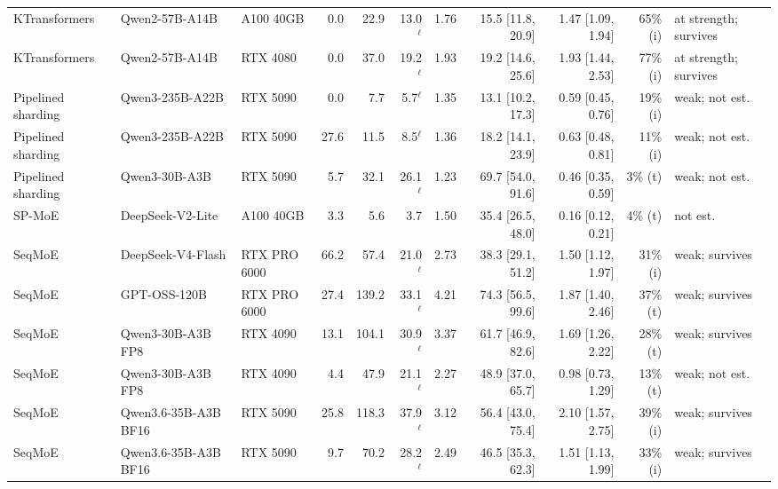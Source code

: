 \begin{table}[t]
{\begin{tabular}{lllrrrrrrrl}
KTransformers & Qwen2-57B-A14B & A100 40GB & 0.0 & 22.9 & 13.0$^\ell$ & 1.76 & 15.5 [11.8, 20.9] & 1.47 [1.09, 1.94] & 65\% (i) & at strength; survives \\
KTransformers & Qwen2-57B-A14B & RTX 4080 & 0.0 & 37.0 & 19.2$^\ell$ & 1.93 & 19.2 [14.6, 25.6] & 1.93 [1.44, 2.53] & 77\% (i) & at strength; survives \\
Pipelined sharding & Qwen3-235B-A22B & RTX 5090 & 0.0 & 7.7 & 5.7$^\ell$ & 1.35 & 13.1 [10.2, 17.3] & 0.59 [0.45, 0.76] & 19\% (i) & weak; not est. \\
Pipelined sharding & Qwen3-235B-A22B & RTX 5090 & 27.6 & 11.5 & 8.5$^\ell$ & 1.36 & 18.2 [14.1, 23.9] & 0.63 [0.48, 0.81] & 11\% (i) & weak; not est. \\
Pipelined sharding & Qwen3-30B-A3B & RTX 5090 & 5.7 & 32.1 & 26.1$^\ell$ & 1.23 & 69.7 [54.0, 91.6] & 0.46 [0.35, 0.59] & 3\% (t) & weak; not est. \\
SP-MoE & DeepSeek-V2-Lite & A100 40GB & 3.3 & 5.6 & 3.7 & 1.50 & 35.4 [26.5, 48.0] & 0.16 [0.12, 0.21] & 4\% (t) & not est. \\
SeqMoE & DeepSeek-V4-Flash & RTX PRO 6000 & 66.2 & 57.4 & 21.0$^\ell$ & 2.73 & 38.3 [29.1, 51.2] & 1.50 [1.12, 1.97] & 31\% (i) & weak; survives \\
SeqMoE & GPT-OSS-120B & RTX PRO 6000 & 27.4 & 139.2 & 33.1$^\ell$ & 4.21 & 74.3 [56.5, 99.6] & 1.87 [1.40, 2.46] & 37\% (t) & weak; survives \\
SeqMoE & Qwen3-30B-A3B FP8 & RTX 4090 & 13.1 & 104.1 & 30.9$^\ell$ & 3.37 & 61.7 [46.9, 82.6] & 1.69 [1.26, 2.22] & 28\% (t) & weak; survives \\
SeqMoE & Qwen3-30B-A3B FP8 & RTX 4090 & 4.4 & 47.9 & 21.1$^\ell$ & 2.27 & 48.9 [37.0, 65.7] & 0.98 [0.73, 1.29] & 13\% (t) & weak; not est. \\
SeqMoE & Qwen3.6-35B-A3B BF16 & RTX 5090 & 25.8 & 118.3 & 37.9$^\ell$ & 3.12 & 56.4 [43.0, 75.4] & 2.10 [1.57, 2.75] & 39\% (i) & weak; survives \\
SeqMoE & Qwen3.6-35B-A3B BF16 & RTX 5090 & 9.7 & 70.2 & 28.2$^\ell$ & 2.49 & 46.5 [35.3, 62.3] & 1.51 [1.13, 1.99] & 33\% (i) & weak; survives \\
\bottomrule\end{tabular}}\end{table}
